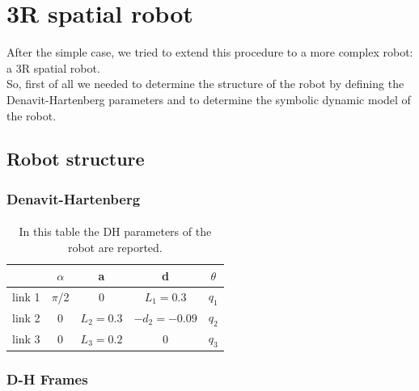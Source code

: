 \documentclass{article}
\begin{document}
\section{3R spatial robot}
After the simple case, we tried to extend this procedure to a more complex robot: a 3R spatial robot.\\
So, first of all we needed to determine the structure of the robot by defining the Denavit-Hartenberg parameters and to determine the symbolic dynamic model of the robot.
\subsection{Robot structure}
\subsubsection*{Denavit-Hartenberg}
\paragraph{}
\FloatBarrier
\begin{table}[!htbp]
\centering
\begin{tabular}{|c|cccc|}
\hline
& $\alpha$ & a & d & $\theta$\\
\hline
link 1 & $\pi$/2 & 0 & $L_1=0.3$ & $q_1$\\
link 2 & 0 & $L_2=0.3$ & $-d_2=-0.09$ & $q_2$\\
link 3 & 0 & $L_3=0.2$ & 0 & $q_3$\\
\hline
\end{tabular}
\caption{In this table the DH parameters of the robot are reported.}
\end{table}
\subsubsection*{D-H Frames}
\end{document}
